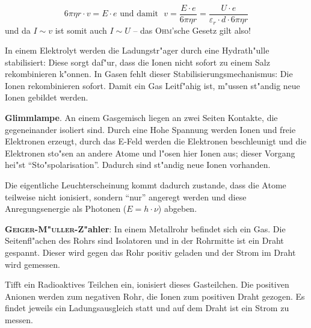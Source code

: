 \begin{description}[\setlabelstyle{\bfseries\slshape}]
\begin{description}[\setlabelstyle{\bfseries\slshape}]
\begin{equation}
         \label{eqn_differenz-c70}
         6 \pi \eta r \cdot v = E \cdot e \text{ und damit ~} v =
         \frac{E \cdot e}{6 \pi \eta r} = \frac{U \cdot
           e}{\varepsilon_r \cdot d \cdot 6 \pi \eta r }
      \end{equation}
      und da $I \sim v$ ist somit auch $I \sim U$ -- das
      \textsc{Ohm}'sche Gesetz gilt also!
   \end{description}
\item[Gase] In einem Elektrolyt werden die Ladungstr"ager durch eine
   Hydrath"ulle  stabilisiert: Diese sorgt daf"ur,
   dass die Ionen nicht sofort zu einem Salz rekombinieren k"onnen. In
   Gasen fehlt dieser Stabilisierungsmechanismus: Die Ionen
   rekombinieren sofort. Damit ein Gas Leitf"ahig ist, m"ussen st"andig
   neue Ionen gebildet werden.

\begin{Beispiel}
    \textbf{Glimmlampe}. An einem Gasgemisch
      liegen an zwei Seiten Kontakte, die gegeneinander isoliert
      sind.  Durch eine Hohe Spannung werden Ionen und freie
      Elektronen erzeugt,  durch das E-Feld werden die Elektronen
      beschleunigt und  die Elektronen sto"sen an andere Atome
      und l"osen hier Ionen aus; dieser Vorgang hei"st
      "`Sto"spolarisation"'. Dadurch sind
      st"andig neue Ionen vorhanden.

      Die eigentliche Leuchterscheinung kommt dadurch zustande, dass
      die Atome teilweise nicht ionisiert, sondern "`nur"' angeregt
      werden und diese Anregungsenergie als Photonen ($E = h \cdot
      \nu$) abgeben.

\bigskip

      \textbf{\textsc{Geiger}-\textsc{M"uller}-Z"ahler}:
      In einem Metallrohr befindet sich ein Gas. Die Seitenfl"achen des
      Rohrs sind Isolatoren und in der Rohrmitte ist ein Draht
      gespannt. Dieser wird gegen das Rohr positiv geladen und der
      Strom im Draht wird gemessen.

      Tifft ein Radioaktives Teilchen ein, ionisiert dieses
      Gasteilchen. Die positiven Anionen werden zum negativen Rohr,
      die Ionen zum positiven Draht gezogen. Es findet jeweils ein
      Ladungsausgleich statt und auf dem Draht ist ein Strom zu
      messen.
\end{Beispiel}
\end{description}






